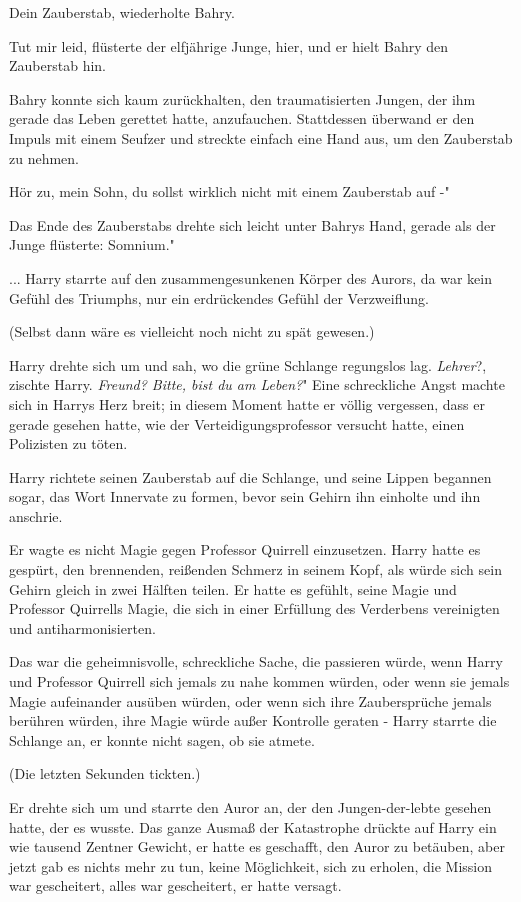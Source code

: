 \glqq{}Dein Zauberstab\grqq{}, wiederholte Bahry.

\glqq{}Tut mir leid\grqq{}, flüsterte der elfjährige Junge, \glqq{}hier\grqq{},
und er hielt Bahry den Zauberstab hin.

Bahry konnte sich kaum zurückhalten, den traumatisierten Jungen, der ihm gerade
das Leben gerettet hatte, anzufauchen. Stattdessen überwand er den Impuls mit
einem Seufzer und streckte einfach eine Hand aus, um den Zauberstab zu nehmen.

\glqq{}Hör zu, mein Sohn, du sollst wirklich nicht mit einem Zauberstab auf -"

Das Ende des Zauberstabs drehte sich leicht unter Bahrys Hand, gerade als der
Junge flüsterte: \glqq{}Somnium."

... Harry starrte auf den zusammengesunkenen Körper des Aurors, da war kein
Gefühl des Triumphs, nur ein erdrückendes Gefühl der Verzweiflung.

(Selbst dann wäre es vielleicht noch nicht zu spät gewesen.)

Harry drehte sich um und sah, wo die grüne Schlange regungslos lag. \glqq{}
\emph{Lehrer}?\grqq{}, zischte Harry. \glqq{}\emph{Freund? Bitte, bist du am
Leben?}" Eine schreckliche Angst machte sich in Harrys Herz breit; in diesem
Moment hatte er völlig vergessen, dass er gerade gesehen hatte, wie der
Verteidigungsprofessor versucht hatte, einen Polizisten zu töten.

Harry richtete seinen Zauberstab auf die Schlange, und seine Lippen begannen
sogar, das Wort Innervate zu formen, bevor sein Gehirn ihn einholte und ihn
anschrie.

Er wagte es nicht Magie gegen Professor Quirrell einzusetzen. Harry hatte es
gespürt, den brennenden, reißenden Schmerz in seinem Kopf, als würde sich sein
Gehirn gleich in zwei Hälften teilen. Er hatte es gefühlt, seine Magie und
Professor Quirrells Magie, die sich in einer Erfüllung des Verderbens
vereinigten und antiharmonisierten.

Das war die geheimnisvolle, schreckliche Sache, die passieren würde, wenn Harry
und Professor Quirrell sich jemals zu nahe kommen würden, oder wenn sie jemals
Magie aufeinander ausüben würden, oder wenn sich ihre Zaubersprüche jemals
berühren würden, ihre Magie würde außer Kontrolle geraten - Harry starrte die
Schlange an, er konnte nicht sagen, ob sie atmete.

(Die letzten Sekunden tickten.)

Er drehte sich um und starrte den Auror an, der den Jungen-der-lebte gesehen
hatte, der es wusste. Das ganze Ausmaß der Katastrophe drückte auf Harry ein wie
tausend Zentner Gewicht, er hatte es geschafft, den Auror zu betäuben, aber
jetzt gab es nichts mehr zu tun, keine Möglichkeit, sich zu erholen, die Mission
war gescheitert, alles war gescheitert, er hatte versagt.

